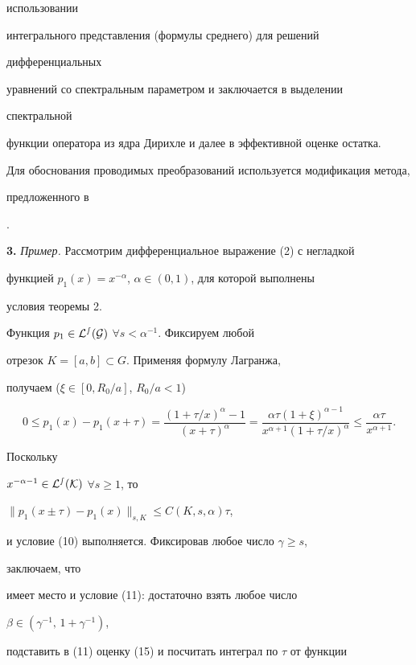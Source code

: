 использовании


интегрального представления (формулы среднего) для решений


дифференциальных


уравнений со спектральным параметром и заключается в выделении


спектральной


функции оператора из ядра Дирихле и далее в эффективной оценке остатка.


Для обоснования проводимых преобразований используется модификация метода,


предложенного в {\cite{10}.


\medskip





{\bf 3.} {\it Пример.} Рассмотрим дифференциальное выражение (2) с негладкой


функцией $p_1(x)=x^{-\alpha}$, $\alpha\in(0,1)$, для которой выполнены


условия теоремы 2.


Функция $p_1\in\cal L^s(G)$ $\forall s<\alpha^{-1}$. Фиксируем любой


отрезок $K=[a,b]\subset G$. Применяя формулу Лагранжа,


получаем ($\xi\in[0,R_0/a]$, $R_0/a<1$)


\begin{equation}


0\le p_1(x)-p_1(x+\tau)=


\frac{(1+\tau/x)^\alpha-1}{(x+\tau)^\alpha}=


\frac{\alpha\tau(1+\xi)^{\alpha-1}}


{x^{\alpha+1}(1+\tau/x)^\alpha}\le


\frac{\alpha\tau}{x^{\alpha+1}}.


\end{equation}


Поскольку


$x^{-\alpha-1}\in\cal L^s(K)$ $\forall s\ge 1$, то


$\|p_1(x\pm\tau)-p_1(x)\|_{s,K}\le C(K,s,\alpha)\tau$,


и условие (10) выполняется. Фиксировав любое число $\gamma\ge s$,


заключаем, что


имеет место и условие (11): достаточно взять любое число


$\beta\in(\gamma^{-1},\,1+\gamma^{-1})$,


подставить в (11) оценку (15) и посчитать интеграл по $\tau$ от функции


}
